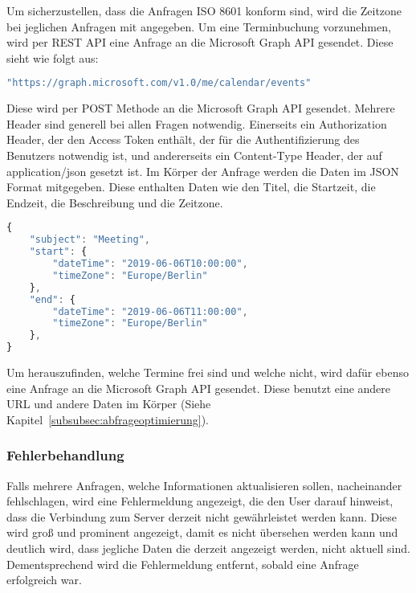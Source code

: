 \newline
Um sicherzustellen, dass die Anfragen ISO 8601 konform sind, wird die Zeitzone bei jeglichen Anfragen mit angegeben.
Um eine Terminbuchung vorzunehmen, wird per REST API eine Anfrage an die Microsoft Graph API gesendet.
\newline
Diese sieht wie folgt aus:
\newline
\begin{lstlisting}[language=JavaScript,label={lst:JavaScript REST API Anfrage}]
"https://graph.microsoft.com/v1.0/me/calendar/events"
\end{lstlisting}
Diese wird per POST Methode an die Microsoft Graph API gesendet.
Mehrere Header sind generell bei allen Fragen notwendig.
Einerseits ein Authorization Header, der den Access Token enthält, der für die Authentifizierung des Benutzers notwendig ist, und andererseits ein Content-Type Header, der auf application/json gesetzt ist.
\newline
Im Körper der Anfrage werden die Daten im JSON Format mitgegeben.
Diese enthalten Daten wie den Titel, die Startzeit, die Endzeit, die Beschreibung und die Zeitzone.
\newpage
\begin{lstlisting}[language=JavaScript,label={lst:JavaScript REST API Körper}]
{
    "subject": "Meeting",
    "start": {
        "dateTime": "2019-06-06T10:00:00",
        "timeZone": "Europe/Berlin"
    },
    "end": {
        "dateTime": "2019-06-06T11:00:00",
        "timeZone": "Europe/Berlin"
    },
}
    \end{lstlisting}
\newline
\newline
Um herauszufinden, welche Termine frei sind und welche nicht, wird dafür ebenso eine Anfrage an die Microsoft Graph API gesendet.
Diese benutzt eine andere URL und andere Daten im Körper (Siehe Kapitel~\ref{subsubsec:abfrageoptimierung}).
\subsubsection{Fehlerbehandlung}\label{subsubsec:fehlerbehandlung-REST}
Falls mehrere Anfragen, welche Informationen aktualisieren sollen, nacheinander fehlschlagen, wird eine Fehlermeldung angezeigt, die den User darauf hinweist, dass die Verbindung zum Server derzeit nicht gewährleistet werden kann.
Diese wird groß und prominent angezeigt, damit es nicht übersehen werden kann und deutlich wird, dass jegliche Daten die derzeit angezeigt werden, nicht aktuell sind.
Dementsprechend wird die Fehlermeldung entfernt, sobald eine Anfrage erfolgreich war.
\newline
\newline
